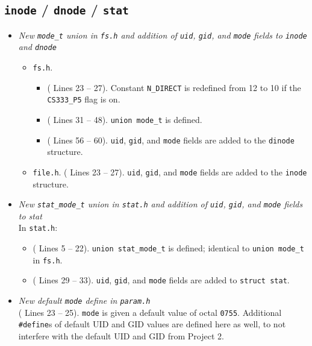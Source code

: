 \documentclass[11pt,letterpaper]{report}
\begin{document}
	\subsection{{\tt inode} / {\tt dnode} / {\tt stat}}
	\begin{itemize}
		\item \emph{New {\tt mode\_t} union in {\tt fs.h} and addition of {\tt uid}, {\tt gid}, and {\tt mode} fields to {\tt inode} and {\tt dnode}}
		\begin{itemize}
			\item {\tt fs.h}.
			\begin{itemize}
				\item ({\color{red} Lines 23 -- 27}). Constant {\tt N\_DIRECT} is redefined from 12 to 10 if the {\tt CS333\_P5} flag is on.
				
				\item ({\color{red} Lines 31 -- 48}). {\tt union mode\_t} is defined.
				
				\item ({\color{red} Lines 56 -- 60}). {\tt uid}, {\tt gid}, and {\tt mode} fields are added to the {\tt dinode} structure.\\
			\end{itemize}
			
			\item {\tt file.h}. ({\color{red} Lines 23 -- 27}). {\tt uid}, {\tt gid}, and {\tt mode} fields are added to the {\tt inode} structure.
			
		\end{itemize}
		
		\item \emph{New {\tt stat\_mode\_t} union in {\tt stat.h} and addition of {\tt uid}, {\tt gid}, and {\tt mode} fields to stat}\\
		In {\tt stat.h}:
		\begin{itemize}
			\item ({\color{red} Lines 5 -- 22}). {\tt union stat\_mode\_t} is defined; identical to {\tt union mode\_t} in {\tt fs.h}.
			
			\item ({\color{red} Lines 29 -- 33}). {\tt uid}, {\tt gid}, and {\tt mode} fields are added to {\tt struct stat}.
		\end{itemize}
		
		\item \emph{New default {\tt mode} define in {\tt param.h}}\\
		({\color{red} Lines 23 -- 25}). {\tt mode} is given a default value of octal {\tt 0755}. Additional {\tt \#define}s of default UID and GID values are defined here as well, to not interfere with the default UID and GID from Project 2.
		

\end{itemize}
\end{document}
